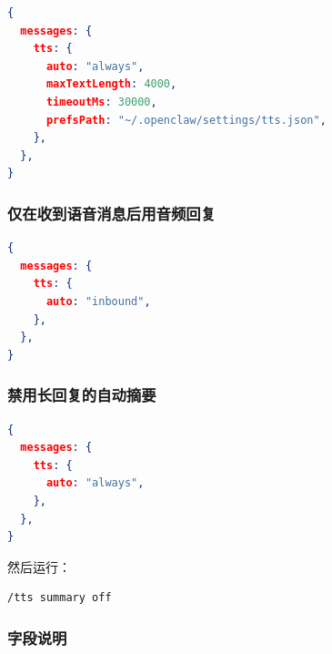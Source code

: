 \begin{lstlisting}[language=json]
{
  messages: {
    tts: {
      auto: "always",
      maxTextLength: 4000,
      timeoutMs: 30000,
      prefsPath: "~/.openclaw/settings/tts.json",
    },
  },
}
\end{lstlisting}


\subsubsection{仅在收到语音消息后用音频回复}


\begin{lstlisting}[language=json]
{
  messages: {
    tts: {
      auto: "inbound",
    },
  },
}
\end{lstlisting}


\subsubsection{禁用长回复的自动摘要}


\begin{lstlisting}[language=json]
{
  messages: {
    tts: {
      auto: "always",
    },
  },
}
\end{lstlisting}


然后运行：

\begin{lstlisting}
/tts summary off
\end{lstlisting}


\subsubsection{字段说明}


